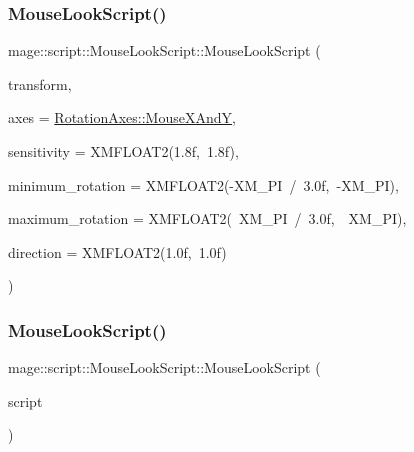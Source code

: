 \subsubsection{\texorpdfstring{Mouse\+Look\+Script()}{MouseLookScript()}\hspace{0.1cm}{\footnotesize\ttfamily [1/3]}}
{\footnotesize\ttfamily mage\+::script\+::\+Mouse\+Look\+Script\+::\+Mouse\+Look\+Script (\begin{DoxyParamCaption}\item[{\hyperlink{classmage_1_1_transform_node}{Transform\+Node} $\ast$}]{transform,  }\item[{\hyperlink{classmage_1_1script_1_1_mouse_look_script_aa8c8ce1a3e6ccefa7b8ddd31be209c23}{Rotation\+Axes}}]{axes = {\ttfamily \hyperlink{classmage_1_1script_1_1_mouse_look_script_aa8c8ce1a3e6ccefa7b8ddd31be209c23a109431b32c091e8a7ad541546c66c522}{Rotation\+Axes\+::\+Mouse\+X\+AndY}},  }\item[{const X\+M\+F\+L\+O\+A\+T2 \&}]{sensitivity = {\ttfamily XMFLOAT2(1.8f,~1.8f)},  }\item[{const X\+M\+F\+L\+O\+A\+T2 \&}]{minimum\+\_\+rotation = {\ttfamily XMFLOAT2(-\/XM\+\_\+PI~/~3.0f,~-\/XM\+\_\+PI)},  }\item[{const X\+M\+F\+L\+O\+A\+T2 \&}]{maximum\+\_\+rotation = {\ttfamily XMFLOAT2(~XM\+\_\+PI~/~3.0f,~~XM\+\_\+PI)},  }\item[{const X\+M\+F\+L\+O\+A\+T2 \&}]{direction = {\ttfamily XMFLOAT2(1.0f,~1.0f)} }\end{DoxyParamCaption})\hspace{0.3cm}{\ttfamily [explicit]}}

\hypertarget{classmage_1_1script_1_1_mouse_look_script_acd2b333978c5310a82ee9b22b7873ad6}{}\label{classmage_1_1script_1_1_mouse_look_script_acd2b333978c5310a82ee9b22b7873ad6} 
\subsubsection{\texorpdfstring{Mouse\+Look\+Script()}{MouseLookScript()}\hspace{0.1cm}{\footnotesize\ttfamily [2/3]}}
{\footnotesize\ttfamily mage\+::script\+::\+Mouse\+Look\+Script\+::\+Mouse\+Look\+Script (\begin{DoxyParamCaption}\item[{const \hyperlink{classmage_1_1script_1_1_mouse_look_script}{Mouse\+Look\+Script} \&}]{script }\end{DoxyParamCaption})\hspace{0.3cm}{\ttfamily [delete]}}

